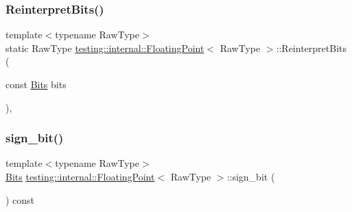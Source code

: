 \subsubsection{\texorpdfstring{Reinterpret\+Bits()}{ReinterpretBits()}}
{\footnotesize\ttfamily template$<$typename Raw\+Type$>$ \\
static Raw\+Type \hyperlink{classtesting_1_1internal_1_1FloatingPoint}{testing\+::internal\+::\+Floating\+Point}$<$ Raw\+Type $>$\+::Reinterpret\+Bits (\begin{DoxyParamCaption}\item[{const \hyperlink{classtesting_1_1internal_1_1FloatingPoint_abf228bf6cd48f12c8b44c85b4971a731}{Bits}}]{bits }\end{DoxyParamCaption})\hspace{0.3cm}{\ttfamily [inline]}, {\ttfamily [static]}}

\mbox{\label{classtesting_1_1internal_1_1FloatingPoint_afb8a816bb598225d775caaf43a893ef0}} 
\subsubsection{\texorpdfstring{sign\+\_\+bit()}{sign\_bit()}}
{\footnotesize\ttfamily template$<$typename Raw\+Type$>$ \\
\hyperlink{classtesting_1_1internal_1_1FloatingPoint_abf228bf6cd48f12c8b44c85b4971a731}{Bits} \hyperlink{classtesting_1_1internal_1_1FloatingPoint}{testing\+::internal\+::\+Floating\+Point}$<$ Raw\+Type $>$\+::sign\+\_\+bit (\begin{DoxyParamCaption}{ }\end{DoxyParamCaption}) const\hspace{0.3cm}{\ttfamily [inline]}}

\mbox{\label{classtesting_1_1internal_1_1FloatingPoint_a2cf0e39c6ebf026bc0353100d031ca85}} 
